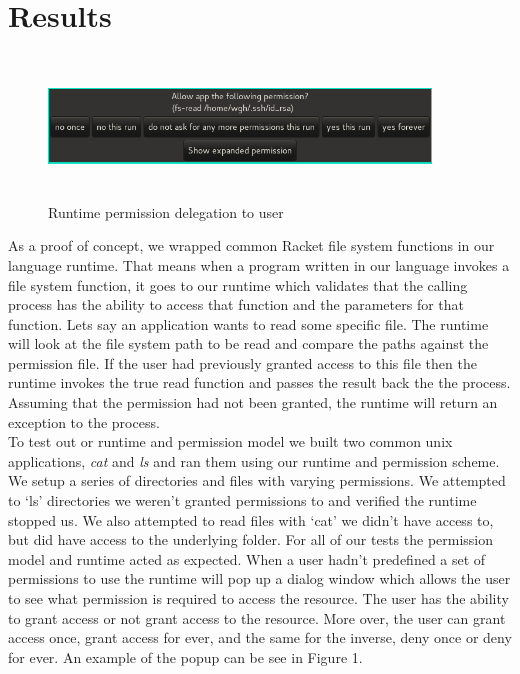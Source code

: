 \section{Results}\label{section:ResImp}
\begin{figure}
\centering
\includegraphics[height=1.5in, width=4in]{ask-permission.png}
\caption{Runtime permission delegation to user}
\end{figure}

\indent
As a proof of concept, we wrapped common Racket file system functions in our language runtime. That means when a program written in our language invokes a file system function, it goes to our runtime which validates that the calling process has the ability to access that function and the parameters for that function. Lets say an application wants to read some specific file. The runtime will look at the file system path to be read and compare the paths against the permission file. If the user had previously granted access to this file then the runtime invokes the true read function and passes the result back the the process. Assuming that the permission had not been granted, the runtime will return an exception to the process.
\\
\indent
To test out or runtime and permission model we built two common unix applications, \textit{cat} and \textit{ls} and ran them using our runtime and permission scheme. We setup a series of directories and files with varying permissions. We attempted to `ls' directories we weren't granted permissions to and verified the runtime stopped us. We also attempted to read files with `cat' we didn't have access to, but did have access to the underlying folder. For all of our tests the permission model and runtime acted as expected. When a user hadn't predefined a set of permissions to use the runtime will pop up a dialog window which allows the user to see what permission is required to access the resource. The user has the ability to grant access or not grant access to the resource. More over, the user can grant access once, grant access for ever, and the same for the inverse, deny once or deny for ever. An example of the popup can be see in Figure 1.


